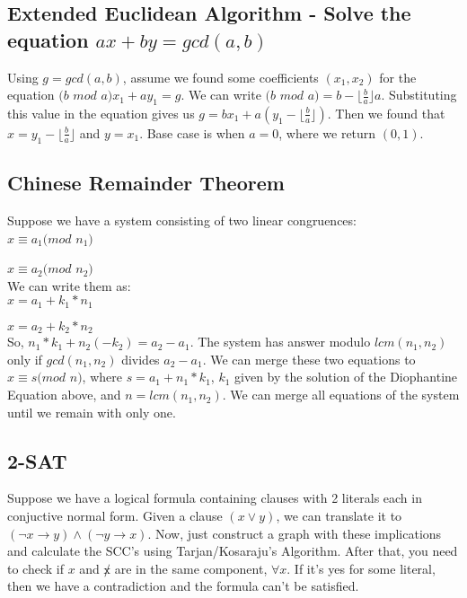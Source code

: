\documentclass[12pt]{article}%
\begin{document}
\subsection{Extended Euclidean Algorithm - Solve the equation $ax + by = gcd(a,b)$}

Using $g = gcd(a,b)$, assume we found some coefficients $(x_1,x_2)$ for the equation $(b$ $mod$ $a)x_1 + ay_1 = g$. We can write $(b$ $mod$ $a) = b - \lfloor \frac{b}{a} \rfloor a$. Substituting this value in the equation gives us $g = bx_1 + a (y_1 - \lfloor \frac{b}{a} \rfloor)$. Then we found that $x = y_1 - \lfloor \frac{b}{a} \rfloor$ and $y = x_1$. Base case is when $a = 0$, where we return $(0,1)$.

\subsection{Chinese Remainder Theorem}

Suppose we have a system consisting of two linear congruences:\\

\hspace{2mm} $x \equiv a_1 (mod$ $n_1)$ 

\hspace{2mm} $x \equiv a_2 (mod$ $n_2)$\\

We can write them as:\\
 
\hspace{2mm} $x = a_1  + k_1*n_1$ 

\hspace{2mm} $x = a_2  + k_2*n_2$\\
 

So, $n_1*k_1 + n_2(-k_2) = a_2 - a_1$. The system has answer modulo $lcm(n_1, n_2)$ only if $gcd(n_1,n_2)$ divides $a_2 - a_1$. We can merge these two equations to $x \equiv s (mod$ $n)$, where $s = a_1 + n_1*k_1$, $k_1$ given by the solution of the Diophantine Equation above, and $n = lcm(n_1, n_2)$. We can merge all equations of the system until we remain with only one.

\subsection{2-SAT}

Suppose we have a logical formula containing clauses with 2 literals each in conjuctive normal form. Given a clause $(x \lor y)$, we can translate it to $(\neg x \rightarrow y) \land (\neg y \rightarrow x)$. Now, just construct a graph with these implications and calculate the SCC's using Tarjan/Kosaraju's Algorithm. After that, you need to check if $x$ and $\not x$ are in the same component, $\forall x$. If it's yes for some literal, then we have a contradiction and the formula can't be satisfied.
\end{document}
